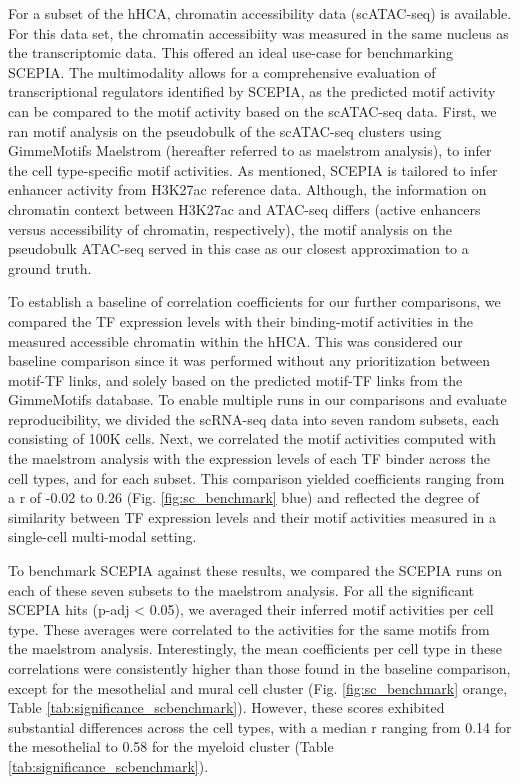 For a subset of the hHCA, chromatin accessibility data (scATAC-seq) is available. For this data set, the chromatin accessibiity was measured in the same nucleus as the transcriptomic data. This offered an ideal use-case for benchmarking SCEPIA. The multimodality allows for a comprehensive evaluation of transcriptional regulators identified by SCEPIA, as the predicted motif activity can be compared to the motif activity based on the scATAC-seq data. First, we ran motif analysis on the pseudobulk of the scATAC-seq clusters using GimmeMotifs Maelstrom\cite{Bruse_2018} (hereafter referred to as maelstrom analysis), to infer the cell type-specific motif activities. As mentioned, SCEPIA is tailored to infer enhancer activity from H3K27ac reference data. Although, the information on chromatin context between H3K27ac and ATAC-seq differs (active enhancers versus accessibility of chromatin, respectively), the motif analysis on the pseudobulk ATAC-seq served in this case as our closest approximation to a ground truth. 

To establish a baseline of correlation coefficients for our further comparisons, we compared the TF expression levels with their binding-motif activities in the measured accessible chromatin within the hHCA. This was considered our baseline comparison since it was performed without any prioritization between motif-TF links, and solely based on the predicted motif-TF links from the GimmeMotifs database. To enable multiple runs in our comparisons and evaluate reproducibility, we divided the scRNA-seq data into seven random subsets, each consisting of 100K cells. Next, we correlated the motif activities computed with the maelstrom analysis with the expression levels of each TF binder across the cell types, and for each subset. This comparison yielded coefficients ranging from a r of -0.02 to 0.26 (Fig. \ref{fig:sc_benchmark} blue) and reflected the degree of similarity between TF expression levels and their motif activities measured in a single-cell multi-modal setting.

To benchmark SCEPIA against these results, we compared the SCEPIA runs on each of these seven subsets to the maelstrom analysis. For all the significant SCEPIA hits (p-adj < 0.05), we averaged their inferred motif activities per cell type. These averages were correlated to the activities for the same motifs from the maelstrom analysis. Interestingly, the mean coefficients per cell type in these correlations were consistently higher than those found in the baseline comparison, except for the mesothelial and mural cell cluster (Fig. \ref{fig:sc_benchmark} orange, Table \ref{tab:significance_scbenchmark}). However, these scores exhibited substantial differences across the cell types, with a median r ranging from 0.14 for the mesothelial to 0.58 for the myeloid cluster (Table \ref{tab:significance_scbenchmark}).

